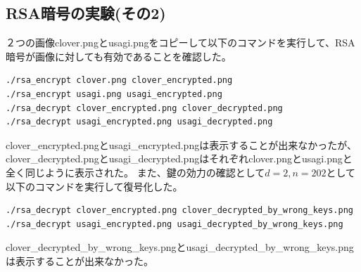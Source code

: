 \documentclass[a4j]{celb-report}
\begin{document}
\subsection{RSA暗号の実験(その2)}
２つの画像clover.pngとusagi.pngをコピーして以下のコマンドを実行して、RSA暗号が画像に対しても有効であることを確認した。
\begin{lstlisting}[basicstyle=\ttfamily\footnotesize, frame=single]
./rsa_encrypt clover.png clover_encrypted.png
./rsa_encrypt usagi.png usagi_encrypted.png
./rsa_decrypt clover_encrypted.png clover_decrypted.png
./rsa_decrypt usagi_encrypted.png usagi_decrypted.png
\end{lstlisting}
clover\_encrypted.pngとusagi\_encrypted.pngは表示することが出来なかったが、clover\_decrypted.pngとusagi\_decrypted.pngはそれぞれclover.pngとusagi.pngと全く同じように表示された。 また、鍵の効力の確認として$ d = 2, n = 202 $として以下のコマンドを実行して復号化した。
\begin{lstlisting}[basicstyle=\ttfamily\footnotesize, frame=single]
./rsa_decrypt clover_encrypted.png clover_decrypted_by_wrong_keys.png
./rsa_decrypt usagi_encrypted.png usagi_decrypted_by_wrong_keys.png
\end{lstlisting}
clover\_decrypted\_by\_wrong\_keys.pngとusagi\_decrypted\_by\_wrong\_keys.pngは表示することが出来なかった。
\end{document}
